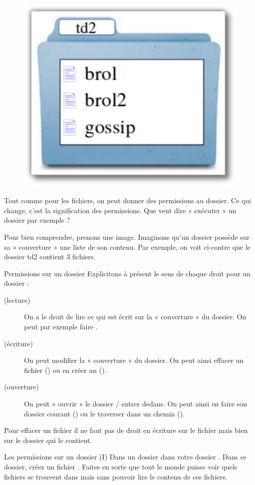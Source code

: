 \documentclass[a4paper,11pt]{style-esi/td}
\begin{document}
		\begin{figure}
			\vspace{-1em}
			\includegraphics[width=.2\textwidth]{image/perm-dossier.pdf}
			\vspace{-4em}
		\end{figure}
		Tout comme pour les fichiers, on peut donner des permissions au dossier. 
		Ce qui change, c'est la signification des permissions. 
		Que veut dire « exécuter » un dossier par exemple ? 
		
		Pour bien comprendre, prenons une image.
		Imaginons qu'un dossier possède sur sa « couverture » une liste de son contenu. 
		Par exemple, on voit ci-contre que le dossier td2 contient 3 fichiers.
		
		\begin{theorie}{Permissions sur un dossier}
			Explicitons à présent le sens de chaque droit pour un dossier :
			\begin{description}
			\item[ (lecture)] 
				On a le droit de lire ce qui est écrit sur la « couverture » du dossier. 
				On peut par exemple faire .
			\item[ (écriture)] 
				On peut modifier la « couverture » du dossier. 
				On peut ainsi effacer un fichier ()
				ou en créer un (). 
			\item[ (ouverture)]
				On peut « ouvrir » le dossier / entrer dedans. 
				On peut ainsi en faire son dossier courant () 
				ou le traverser dans un chemin ().				
			\end{description}
		\end{theorie}

		\begin{alertbox}
			Pour effacer un fichier 
			il ne faut pas de droit en écriture sur le fichier 
			mais bien sur le dossier qui le contient.
		\end{alertbox}
		
		\begin{Exercice}{Les permissions sur un dossier (I)}           
			Dans un dossier  dans votre dossier .
			Dans ce dossier, créez un fichier .
			Faites en sorte que tout le monde puisse voir 
			quels fichiers se trouvent dans 
			mais sans pouvoir lire le contenu de ces fichiers.
		\end{Exercice}
\end{document}
